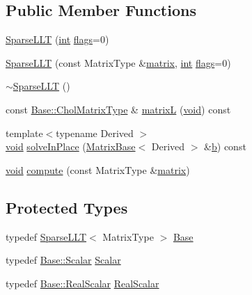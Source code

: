 \subsection*{Public Member Functions}
\begin{DoxyCompactItemize}
\item 
\hyperlink{class_sparse_l_l_t_3_01_matrix_type_00_01_cholmod_01_4_ae786b19f1950f3af977af288d1eec15b}{Sparse\-L\-L\-T} (\hyperlink{ioapi_8h_a787fa3cf048117ba7123753c1e74fcd6}{int} \hyperlink{class_sparse_l_l_t_a7649229f826139f5c457f91e1fc996ce}{flags}=0)
\item 
\hyperlink{class_sparse_l_l_t_3_01_matrix_type_00_01_cholmod_01_4_a0b91c0e7b652edf56de32627901c0757}{Sparse\-L\-L\-T} (const Matrix\-Type \&\hyperlink{glext_8h_a7b24a3f2f56eb1244ae69dacb4fecb6f}{matrix}, \hyperlink{ioapi_8h_a787fa3cf048117ba7123753c1e74fcd6}{int} \hyperlink{class_sparse_l_l_t_a7649229f826139f5c457f91e1fc996ce}{flags}=0)
\item 
\hyperlink{class_sparse_l_l_t_3_01_matrix_type_00_01_cholmod_01_4_aed9904f8c07822535f97d6cca0d18511}{$\sim$\-Sparse\-L\-L\-T} ()
\item 
const \hyperlink{class_sparse_l_l_t_a2c9d9dfe18d1e70b0f46de8c9d106bf2}{Base\-::\-Chol\-Matrix\-Type} \& \hyperlink{class_sparse_l_l_t_3_01_matrix_type_00_01_cholmod_01_4_a890d2fe1a5e9511a895b0f7dcfbfb831}{matrix\-L} (\hyperlink{group___u_a_v_objects_plugin_ga444cf2ff3f0ecbe028adce838d373f5c}{void}) const 
\item 
{\footnotesize template$<$typename Derived $>$ }\\\hyperlink{group___u_a_v_objects_plugin_ga444cf2ff3f0ecbe028adce838d373f5c}{void} \hyperlink{class_sparse_l_l_t_3_01_matrix_type_00_01_cholmod_01_4_a4ca324f2987bbc69a47ad61c1322b9aa}{solve\-In\-Place} (\hyperlink{class_matrix_base}{Matrix\-Base}$<$ Derived $>$ \&\hyperlink{glext_8h_a6eba317e3cf44d6d26c04a5a8f197dcb}{b}) const 
\item 
\hyperlink{group___u_a_v_objects_plugin_ga444cf2ff3f0ecbe028adce838d373f5c}{void} \hyperlink{class_sparse_l_l_t_3_01_matrix_type_00_01_cholmod_01_4_a584b15b017ffef0cb1ae27f0f89d5728}{compute} (const Matrix\-Type \&\hyperlink{glext_8h_a7b24a3f2f56eb1244ae69dacb4fecb6f}{matrix})
\end{DoxyCompactItemize}
\subsection*{Protected Types}
\begin{DoxyCompactItemize}
\item 
typedef \hyperlink{class_sparse_l_l_t}{Sparse\-L\-L\-T}$<$ Matrix\-Type $>$ \hyperlink{class_sparse_l_l_t_3_01_matrix_type_00_01_cholmod_01_4_a575af95841f65bd4e510bc6adf91321e}{Base}
\item 
typedef \hyperlink{class_sparse_l_l_t_acc629078ed9cd42c5d1d2c16012de3a4}{Base\-::\-Scalar} \hyperlink{class_sparse_l_l_t_3_01_matrix_type_00_01_cholmod_01_4_a5596883c159a7f38bb6d63ec36425f47}{Scalar}
\item 
typedef \hyperlink{class_sparse_l_l_t_a20661706ee54d830837a844d675fb236}{Base\-::\-Real\-Scalar} \hyperlink{class_sparse_l_l_t_3_01_matrix_type_00_01_cholmod_01_4_a79b9069879f62d8c56e210aa1b1b545b}{Real\-Scalar}
\end{DoxyCompactItemize}
